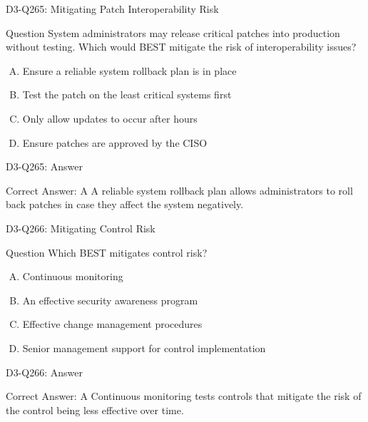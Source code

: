 \documentclass{beamer}
\begin{document}
	\begin{frame}{D3-Q265: Mitigating Patch Interoperability Risk}
		\begin{block}{Question}
			System administrators may release critical patches into production without testing. Which would BEST mitigate the risk of interoperability issues?
		\end{block}
		\begin{enumerate}[(A)]
			\item Ensure a reliable system rollback plan is in place
			\item Test the patch on the least critical systems first
			\item Only allow updates to occur after hours
			\item Ensure patches are approved by the CISO
		\end{enumerate}
	\end{frame}
	\begin{frame}{D3-Q265: Answer}
		\begin{block}{Correct Answer: A}
			A reliable system rollback plan allows administrators to roll back patches in case they affect the system negatively.
		\end{block}
	\end{frame}
	
	\begin{frame}{D3-Q266: Mitigating Control Risk}
		\begin{block}{Question}
			Which BEST mitigates control risk?
		\end{block}
		\begin{enumerate}[(A)]
			\item Continuous monitoring
			\item An effective security awareness program
			\item Effective change management procedures
			\item Senior management support for control implementation
		\end{enumerate}
	\end{frame}
	\begin{frame}{D3-Q266: Answer}
		\begin{block}{Correct Answer: A}
			Continuous monitoring tests controls that mitigate the risk of the control being less effective over time.
		\end{block}
	\end{frame}
	
\end{document}
